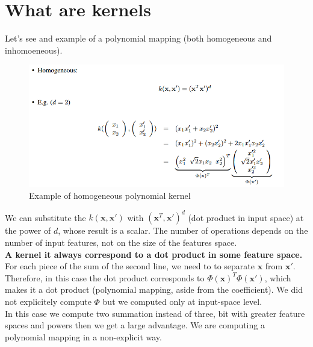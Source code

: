 \section{What are kernels}
    Let's see and example of a polynomial mapping (both homogeneous and inhomoeneous). 
    \begin{figure} [ht]
        \centering
        \includegraphics[scale=0.5]{images/homo_poly.png}
        \caption{Example of homogeneous polynomial kernel}
        \label{fig:homo_poly_kernel}
    \end{figure}
    We can substitute the $k(\pmb{x}, \pmb{x}')$ with $(\pmb{x}^T, \pmb{x}')^d$ (dot product in input space) at the power of $d$, whose result is a scalar. The number of operations depends on the number of input features, not on the size of the features space.\\
    \textbf{A kernel it always correspond to a dot product in some feature space.}
    For each piece of the sum of the second line, we need to to separate $\pmb{x}$ from $\pmb{x}'$. 
    Therefore, in this case the dot product corresponds to $\Phi(\pmb{x})^T \Phi(\pmb{x}')$, which makes it a dot product (polynomial mapping, aside from the coefficient). 
    We did not explicitely compute $\Phi$ but we computed only at input-space level.\\
    In this case we compute two summation instead of three, bit with greater feature spaces and powers then we get a large advantage.
    We are computing a polynomial mapping in a non-explicit way.\\

